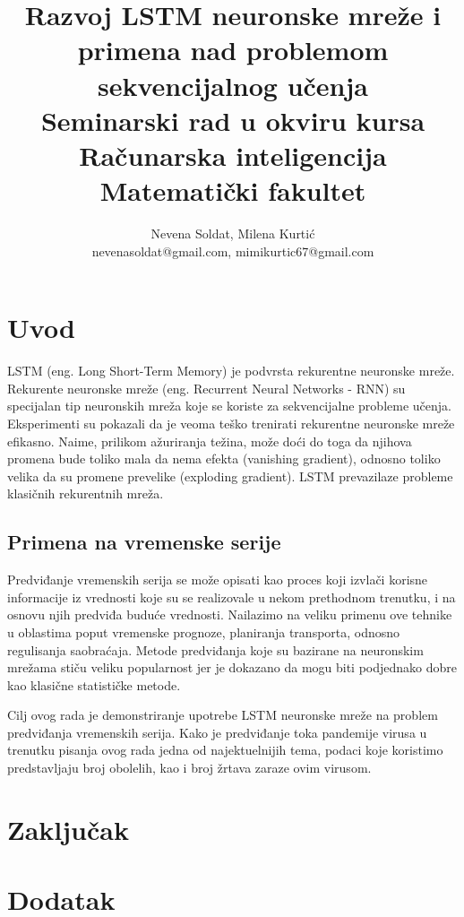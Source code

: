 \documentclass[a4paper]{article}
\begin{document}
\title{Razvoj LSTM neuronske mreže i primena nad problemom sekvencijalnog učenja\\ \small{Seminarski rad u okviru kursa\\Računarska inteligencija\\ Matematički fakultet}}

\author{Nevena Soldat, Milena Kurtić\\ nevenasoldat@gmail.com, mimikurtic67@gmail.com}


\maketitle

\abstract{

}

\tableofcontents

\newpage

\section{Uvod}
\label{sec:uvod}
LSTM (eng. Long Short-Term Memory) je podvrsta rekurentne neuronske mreže. Rekurente neuronske mreže (eng. Recurrent Neural Networks - RNN) su specijalan tip neuronskih mreža koje se koriste za sekvencijalne probleme učenja. Eksperimenti su pokazali da je veoma teško trenirati rekurentne neuronske mreže efikasno. Naime, prilikom ažuriranja težina, može doći do toga da njihova promena bude toliko mala da nema efekta (vanishing gradient), odnosno toliko velika da su promene prevelike (exploding gradient). LSTM prevazilaze probleme klasičnih rekurentnih mreža. 

\subsection{Primena na vremenske serije}
Predviđanje vremenskih serija se može opisati kao proces koji izvlači korisne informacije iz vrednosti koje su se realizovale u nekom prethodnom trenutku, i na osnovu njih predviđa buduće vrednosti. Nailazimo na veliku primenu ove tehnike u oblastima poput vremenske prognoze, planiranja transporta, odnosno regulisanja saobraćaja. Metode predviđanja koje su bazirane na neuronskim mrežama stiču veliku popularnost jer je dokazano da mogu biti podjednako dobre kao klasične statističke metode. 

Cilj ovog rada je demonstriranje upotrebe LSTM neuronske mreže na problem predviđanja vremenskih serija. Kako je predviđanje toka pandemije virusa u trenutku pisanja ovog rada jedna od najektuelnijih tema, podaci koje koristimo predstavljaju broj obolelih, kao i broj žrtava zaraze ovim virusom.  







\section{Zaključak}
\label{sec:zakljucak}


\appendix
 


\appendix
\section{Dodatak}
\end{document}
